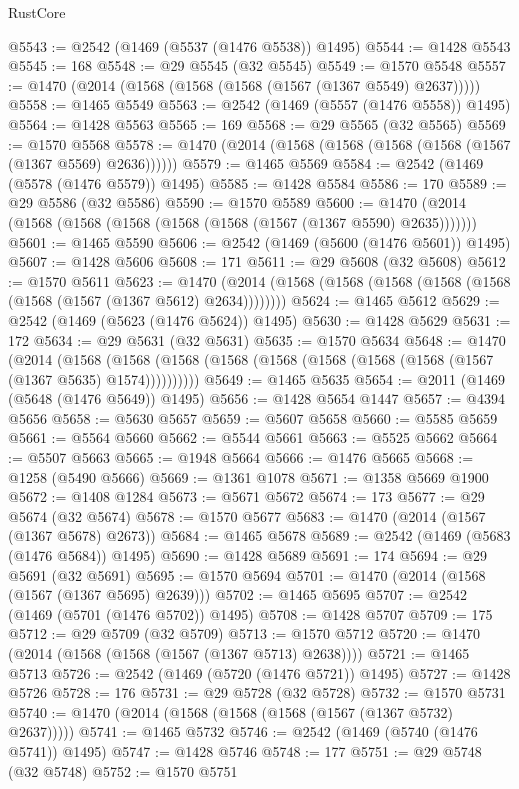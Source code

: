 \begin{lexlean}{RustCore}
\begin{coremodule}
@5543 := @2542 (@1469 (@5537 (@1476 @5538)) @1495)
@5544 := @1428 @5543
@5545 := 168
@5548 := @29 @5545 (@32 @5545)
@5549 := @1570 @5548
@5557 := @1470 (@2014 (@1568 (@1568 (@1568 (@1567 (@1367 @5549) @2637)))))
@5558 := @1465 @5549
@5563 := @2542 (@1469 (@5557 (@1476 @5558)) @1495)
@5564 := @1428 @5563
@5565 := 169
@5568 := @29 @5565 (@32 @5565)
@5569 := @1570 @5568
@5578 := @1470 (@2014 (@1568 (@1568 (@1568 (@1568 (@1567 (@1367 @5569) @2636))))))
@5579 := @1465 @5569
@5584 := @2542 (@1469 (@5578 (@1476 @5579)) @1495)
@5585 := @1428 @5584
@5586 := 170
@5589 := @29 @5586 (@32 @5586)
@5590 := @1570 @5589
@5600 := @1470 (@2014 (@1568 (@1568 (@1568 (@1568 (@1568 (@1567 (@1367 @5590) @2635)))))))
@5601 := @1465 @5590
@5606 := @2542 (@1469 (@5600 (@1476 @5601)) @1495)
@5607 := @1428 @5606
@5608 := 171
@5611 := @29 @5608 (@32 @5608)
@5612 := @1570 @5611
@5623 := @1470 (@2014 (@1568 (@1568 (@1568 (@1568 (@1568 (@1568 (@1567 (@1367 @5612) @2634))))))))
@5624 := @1465 @5612
@5629 := @2542 (@1469 (@5623 (@1476 @5624)) @1495)
@5630 := @1428 @5629
@5631 := 172
@5634 := @29 @5631 (@32 @5631)
@5635 := @1570 @5634
@5648 := @1470
    (@2014
      (@1568 (@1568 (@1568 (@1568 (@1568 (@1568 (@1568 (@1568 (@1567 (@1367 @5635) @1574))))))))))
@5649 := @1465 @5635
@5654 := @2011 (@1469 (@5648 (@1476 @5649)) @1495)
@5656 := @1428 @5654 @1447
@5657 := @4394 @5656
@5658 := @5630 @5657
@5659 := @5607 @5658
@5660 := @5585 @5659
@5661 := @5564 @5660
@5662 := @5544 @5661
@5663 := @5525 @5662
@5664 := @5507 @5663
@5665 := @1948 @5664
@5666 := @1476 @5665
@5668 := @1258 (@5490 @5666)
@5669 := @1361 @1078
@5671 := @1358 @5669 @1900
@5672 := @1408 @1284
@5673 := @5671 @5672
@5674 := 173
@5677 := @29 @5674 (@32 @5674)
@5678 := @1570 @5677
@5683 := @1470 (@2014 (@1567 (@1367 @5678) @2673))
@5684 := @1465 @5678
@5689 := @2542 (@1469 (@5683 (@1476 @5684)) @1495)
@5690 := @1428 @5689
@5691 := 174
@5694 := @29 @5691 (@32 @5691)
@5695 := @1570 @5694
@5701 := @1470 (@2014 (@1568 (@1567 (@1367 @5695) @2639)))
@5702 := @1465 @5695
@5707 := @2542 (@1469 (@5701 (@1476 @5702)) @1495)
@5708 := @1428 @5707
@5709 := 175
@5712 := @29 @5709 (@32 @5709)
@5713 := @1570 @5712
@5720 := @1470 (@2014 (@1568 (@1568 (@1567 (@1367 @5713) @2638))))
@5721 := @1465 @5713
@5726 := @2542 (@1469 (@5720 (@1476 @5721)) @1495)
@5727 := @1428 @5726
@5728 := 176
@5731 := @29 @5728 (@32 @5728)
@5732 := @1570 @5731
@5740 := @1470 (@2014 (@1568 (@1568 (@1568 (@1567 (@1367 @5732) @2637)))))
@5741 := @1465 @5732
@5746 := @2542 (@1469 (@5740 (@1476 @5741)) @1495)
@5747 := @1428 @5746
@5748 := 177
@5751 := @29 @5748 (@32 @5748)
@5752 := @1570 @5751

\end{coremodule}
\end{lexlean}
